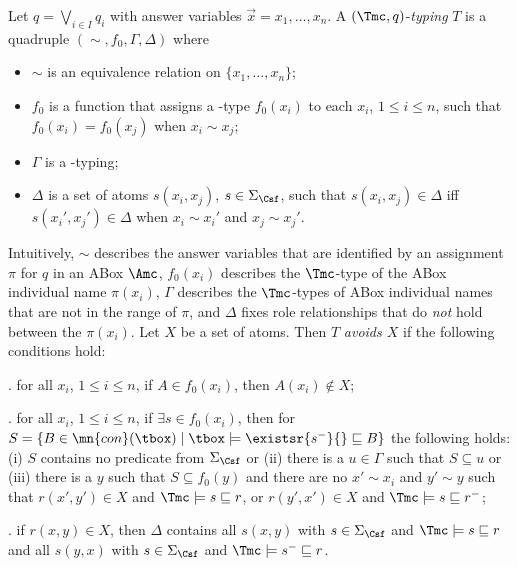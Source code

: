 \documentclass{lmcs}
\theoremstyle{definition}
\begin{document}
  Let $q=\bigvee_{i\in I}q_{i}$ with answer variables
  $\vec{x}=x_{1},\ldots,x_{n}$.
  A $(\Tmc,q)$-\emph{typing} $T$ is a quadruple
  $(\sim,f_{0},\Gamma,\Delta)$ where
  \begin{itemize}
  \item $\sim$ is an equivalence relation on $\{x_{1},\ldots,x_{n}\}$;
  \item $f_{0}$ is a function that assigns a \Tmc-type $f_{0}(x_{i})$
    to each $x_{i}$, $1\leq i \leq n$, such that
    $f_{0}(x_{i})=f_{0}(x_{j})$ when $x_{i}\sim x_{j}$;
  \item $\Gamma$ is a \Tmc-typing;
  \item $\Delta$ is a set of atoms $s(x_{i},x_{j})$, $s\in \Sigma_{\Csf}$,
    such that $s(x_{i},x_{j})\in \Delta$ iff $s(x_{i}',x_{j}')\in
    \Delta$ when $x_{i}\sim x_{i}'$ and $x_{j}\sim x_{j}'$.
  \end{itemize}
%
  Intuitively, $\sim$ describes the answer variables that are
  identified by an assignment $\pi$ for $q$ in an ABox $\Amc$, $f_{0}(x_{i})$
  describes the $\Tmc$-type of the ABox individual name $\pi(x_{i})$,
  $\Gamma$ describes the $\Tmc$-types of ABox individual names that are not
  in the range of $\pi$, and $\Delta$ fixes role relationships that do
  \emph{not} hold between the $\pi(x_{i})$. Let $X$ be a set of atoms.
Then $T$ \emph{avoids $X$} if the following conditions hold:

  \smallskip
  . for all $x_{i}$, $1\leq i \leq n$, if $A\in f_{0}(x_{i})$, then $A(x_{i})\not\in X$;

  \smallskip
  . for all $x_{i}$, $1\leq i \leq n$, if $\exists s\in f_{0}(x_{i})$, then for $S=\{B\in\mn{con}(\tbox)\mid
  \tbox\models\existsr{s^-}{}\sqsubseteq B\}$ the following holds: (i) $S$ contains no predicate
  from $\Sigma_{\Csf}$ or (ii) there is a $u \in \Gamma$ such that
  $S\subseteq u$ or (iii) there is a $y$ such that $S\subseteq
  f_{0}(y)$ and there are no $x'\sim x_{i}$ and $y' \sim y$ such that
  $r(x',y') \in X$ and $\Tmc\models s\sqsubseteq r$, or 
  $r(y',x') \in X$ and $\Tmc\models s \sqsubseteq r^{-}$;

  \smallskip
  . if $r(x,y)\in X$, then $\Delta$ contains all $s(x,y)$ with $s\in
  \Sigma_{\Csf}$ and $\Tmc\models s \sqsubseteq r$ and all $s(y,x)$ with
  $s\in \Sigma_{\Csf}$ and $\Tmc\models s^{-}\sqsubseteq r$.
\end{document}
